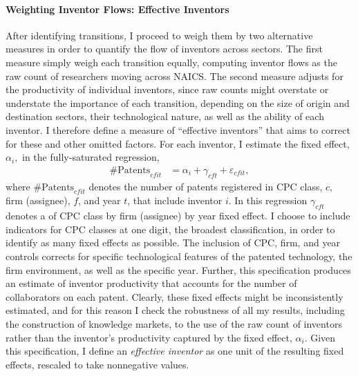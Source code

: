\paragraph{Weighting Inventor Flows: Effective Inventors}

After identifying transitions, I proceed to weigh them by two alternative
measures in order to quantify the flow of inventors across sectors.
The first measure simply weigh each transition equally, computing
inventor flows as the raw count of researchers moving across NAICS.
The second measure adjusts for the productivity of individual inventors,
since raw counts might overstate or understate the importance of each
transition, depending on the size of origin and destination sectors,
their technological nature, as well as the ability of each inventor.
I therefore define a measure of ``effective inventors'' that aims
to correct for these and other omitted factors. For each inventor,
I estimate the fixed effect, $\alpha_{i},$ in the fully-saturated
regression,
\begin{align}
\text{\#Patents}_{cfit} & =\alpha_{i}+\gamma_{cft}+\varepsilon_{cfit},\label{eq:one-1-1}
\end{align}
where $\text{\#Patents}_{cfit}$ denotes the number of patents registered
in CPC class, $c,$ firm (assignee), $f$, and year $t$, that include
inventor $i.$ In this regression $\gamma_{cft}$ denotes a of CPC
class by firm (assignee) by year fixed effect. I choose to include
indicators for CPC classes at one digit, the broadest classification,
in order to identify as many fixed effects as possible. The inclusion
of CPC, firm, and year controls corrects for specific technological
features of the patented technology, the firm environment, as well
as the specific year. Further, this specification produces an estimate
of inventor productivity that accounts for the number of collaborators
on each patent. Clearly, these fixed effects might be inconsistently
estimated, and for this reason I check the robustness of all my results,
including the construction of knowledge markets, to the use of the
raw count of inventors rather than the inventor's productivity captured
by the fixed effect, $\alpha_{i}$. Given this specification, I define
an \emph{effective inventor} as one unit of the resulting fixed effects,
rescaled to take nonnegative values.

